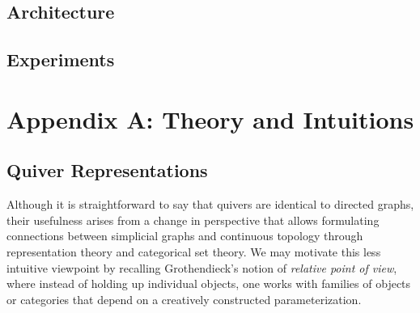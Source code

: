 \documentclass{article}
\newcommand{\comment}[1]{}
\theoremstyle{definition}
\begin{document}
\comment{
    - gromov width describes upper bound of spectrum in relation to projective volume (symplectic capacity)
    - ADE gauge quiver describes graph kernel
    - sieve algorithm iterates over graph types in kernel that are conatained within level sets bounded by max p-width
    - use kernel to compute ADE histogram representation of graph
    - hessian and morse index representation of cycles/critical points (LEE)
    - erestothenes sieve: prime spectrum ~ ADE, composite ~ symplectic
    - 1. create ordered list of A_n, D_n, E_n up to gromov width 
    - 2. locate zero of efunction where cycles occur (exceptional vertex)
    - 3. enumerate dynkin graphs extending from zeroes up to gromov width and mark in list
    - 4. find the next zero and repeat the process
    - 5. create histogram with ADE info from zeroes
}

\subsection{Architecture}

\comment{
Given that any simple graph can be classified to be of ADE type, we can classify an arbitrary graph as some combination of possibly disconnected ADE graphs that may also contain cycles.  
We don't know the Lie groups or their irreps beforehand, but we want to build a convolution kernel to read from arbitrary graph data. 
We may construct a gauge quiver and use its nodes to interpolate between irreps. In some sense, we want to interpolate between derived cohomologies and their invariants, similar to what's done with motives. 
}


\subsection{Experiments}

\section{Appendix A: Theory and Intuitions}

\subsection{Quiver Representations}
\label{sec:quiver-representations}
Although it is straightforward to say that quivers are identical to directed graphs, their usefulness arises from a change in perspective that allows formulating connections between simplicial graphs and continuous topology through representation theory and categorical set theory. We may motivate this less intuitive viewpoint by recalling Grothendieck's notion of \textit{relative point of view}, where instead of holding up individual objects, one works with families of objects or categories that depend on a creatively constructed parameterization. 
\end{document}
